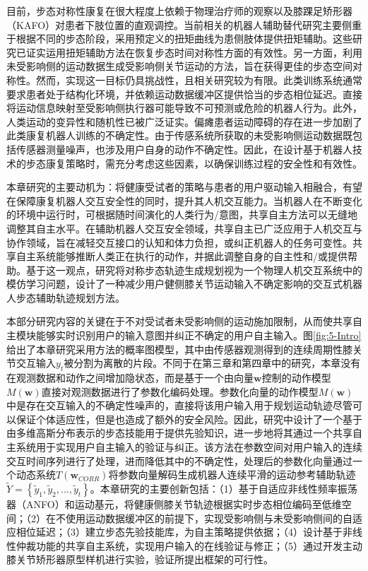 目前，步态对称性康复在很大程度上依赖于物理治疗师的观察以及膝踝足矫形器（KAFO）对患者下肢位置的直观调控\cite{abeNarrativeReviewAlternate2021}。当前相关的机器人辅助替代研究主要侧重于根据不同的步态阶段，采用预定义的扭矩曲线为患侧肢体提供扭矩辅助。这些研究已证实运用扭矩辅助方法在恢复步态时间对称性方面的有效性。另一方面，利用未受影响侧的运动数据生成受影响侧关节运动的方法，旨在获得更佳的步态空间对称性。然而，实现这一目标仍具挑战性，且相关研究较为有限。此类训练系统通常要求患者处于结构化环境，并依赖运动数据缓冲区提供恰当的步态相位延迟。直接将运动信息映射至受影响侧执行器可能导致不可预测或危险的机器人行为。此外，人类运动的变异性和随机性已被广泛证实\cite{vanbeersRoleExecutionNoise2004}。偏瘫患者运动障碍的存在进一步加剧了此类康复机器人训练的不确定性。由于传感系统所获取的未受影响侧运动数据既包括传感器测量噪声，也涉及用户自身的动作不确定性\cite{gopinathCustomizedHandlingUnintended2021}。因此，在设计基于机器人技术的步态康复策略时，需充分考虑这些因素，以确保训练过程的安全性和有效性。

本章研究的主要动机为：将健康受试者的策略与患者的用户驱动输入相融合，有望在保障康复机器人交互安全性的同时，提升其人机交互能力。当机器人在不断变化的环境中运行时，可根据随时间演化的人类行为/意图，共享自主方法可以无缝地调整其自主水平\cite{selvaggioAutonomyPhysicalHumanRobot2021a}。在辅助机器人交互安全领域，共享自主已广泛应用于人机交互与协作领域，旨在减轻交互接口的认知和体力负担\cite{dingHumanintheloopOptimizationHip2018}，或纠正机器人的任务可变性\cite{hagenowCorrectiveSharedAutonomy2021}。共享自主系统能够推断人类正在执行的动作，并据此调整自身的自主性和/或提供帮助。基于这一观点，研究将对称步态轨迹生成规划视为一个物理人机交互系统中的模仿学习问题，设计了一种减少用户健侧膝关节运动输入不确定影响的交互式机器人步态辅助轨迹规划方法。

本部分研究内容的关键在于不对受试者未受影响侧的运动施加限制，从而使共享自主模块能够实时识别用户的输入意图并纠正不确定的用户自主输入。图\ref{fig:5-Intro}给出了本章研究采用方法的概率图模型，其中由传感器观测得到的连续周期性膝关节交互输入$y_t$被分割为离散的片段。不同于在第三章和第四章中的研究，本章没有在观测数据和动作之间增加隐状态，而是基于一个由向量$\pmb{w} $控制的动作模型$M(\pmb{w})$直接对观测数据进行了参数化编码处理。参数化向量的动作模型$M(\pmb{w})$中是存在交互输入的不确定性噪声的，直接将该用户输入用于规划运动轨迹尽管可以保证个体适应性，但是也造成了额外的安全风险。因此，研究中设计了一个基于由多维高斯分布表示的步态技能用于提供先验知识，进一步地将其通过一个共享自主系统用于实现用户自主输入的验证与纠正。该方法在参数空间对用户输入的连续交互时间序列进行了处理，进而降低其中的不确定性，处理后的参数化向量通过一个动态系统$T(\pmb{w}_{CORR})$将参数向量解码生成机器人连续平滑的运动参考辅助轨迹$\widetilde{Y}=\left\{\widetilde{y}_1, \widetilde{y}_2,...,\widetilde{y}_t\right\} $。本章研究的主要创新包括：（1）基于自适应非线性频率振荡器（ANFO）和运动基元，将健康侧膝关节轨迹根据实时步态相位编码至低维空间；（2）在不使用运动数据缓冲区的前提下，实现受影响侧与未受影响侧间的自适应相位延迟；（3）建立步态先验技能库，为自主策略提供依据；（4）设计基于非线性仲裁功能的共享自主系统，实现用户输入的在线验证与修正；（5）通过开发主动膝关节矫形器原型样机进行实验，验证所提出框架的可行性。

